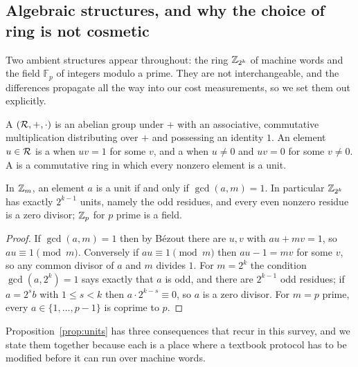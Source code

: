 \subsection{Algebraic structures, and why the choice of ring is not cosmetic}
\label{sec:math:algebra}

Two ambient structures appear throughout: the ring $\mathbb{Z}_{2^k}$ of machine words
and the field $\mathbb{F}_p$ of integers modulo a prime. They are not
interchangeable, and the differences propagate all the way into our cost
measurements, so we set them out explicitly.

\begin{definition}
\label{def:ringfield}
A  $(\mathcal{R},+,\cdot)$ is an abelian group under $+$ with an
associative, commutative multiplication distributing over $+$ and possessing an
identity $1$. An element $u \in \mathcal{R}$ is a  when $uv = 1$ for some
$v$, and a  when $u \ne 0$ and $uv = 0$ for some $v \ne 0$. A
 is a commutative ring in which every nonzero element is a unit.
\end{definition}

\begin{proposition}
\label{prop:units}
In $\mathbb{Z}_m$, an element $a$ is a unit if and only if $\gcd(a,m)=1$. In particular
$\mathbb{Z}_{2^k}$ has exactly $2^{k-1}$ units, namely the odd residues, and every even
nonzero residue is a zero divisor; $\mathbb{Z}_p$ for $p$ prime is a field.
\end{proposition}

\begin{proof}
If $\gcd(a,m)=1$ then by B\'ezout there are $u,v$ with $au+mv=1$, so $au \equiv 1
\pmod m$. Conversely if $au \equiv 1 \pmod m$ then $au - 1 = mv$ for some $v$, so
any common divisor of $a$ and $m$ divides $1$. For $m = 2^k$ the condition
$\gcd(a,2^k)=1$ says exactly that $a$ is odd, and there are $2^{k-1}$ odd
residues; if $a = 2^s b$ with $1 \le s < k$ then $a \cdot 2^{k-s} \equiv 0$, so
$a$ is a zero divisor. For $m = p$ prime, every $a \in \{1,\dots,p-1\}$ is
coprime to $p$.
\end{proof}

Proposition~\ref{prop:units} has three consequences that recur in this survey,
and we state them together because each is a place where a textbook protocol has
to be modified before it can run over machine words.

